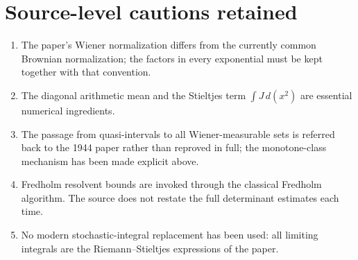 \section{Source-level cautions retained}
\begin{enumerate}[leftmargin=2em]
\item The paper's Wiener normalization differs from the currently common Brownian normalization; the factors in every exponential must be kept together with that convention.
\item The diagonal arithmetic mean and the Stieltjes term \(\int J\,d(x^2)\) are essential numerical ingredients.
\item The passage from quasi-intervals to all Wiener-measurable sets is referred back to the 1944 paper rather than reproved in full; the monotone-class mechanism has been made explicit above.
\item Fredholm resolvent bounds are invoked through the classical Fredholm algorithm.  The source does not restate the full determinant estimates each time.
\item No modern stochastic-integral replacement has been used: all limiting integrals are the Riemann--Stieltjes expressions of the paper.
\end{enumerate}



